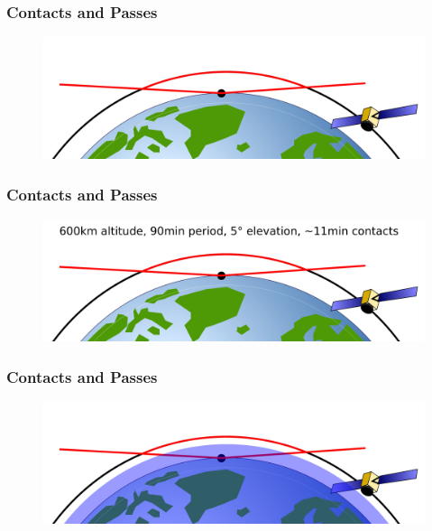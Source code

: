 \documentclass[12pt,utf8,notheorems,compress]{beamer}
\begin{document}
\begin{frame}
  \frametitle{Contacts and Passes}
  \begin{figure}[!ht]
    \centering
    \includegraphics[width=\textwidth]{pass2.png}
  \end{figure}
\end{frame}

\begin{frame}
  \frametitle{Contacts and Passes}
  \begin{figure}[!ht]
    \centering
    \includegraphics[width=\textwidth]{pass3.png}
  \end{figure}
\end{frame}

\begin{frame}
  \frametitle{Contacts and Passes}
  \begin{figure}[!ht]
    \centering
    \includegraphics[width=\textwidth]{pass4.png}
  \end{figure}
\end{frame}
\end{document}

